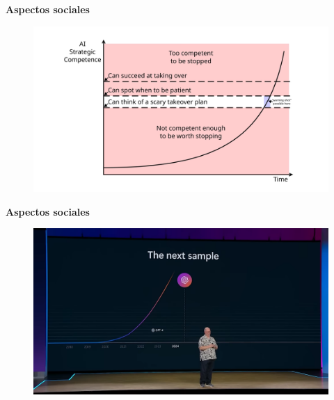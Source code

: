 \documentclass{beamer}
\begin{document}
\begin{frame}{\bfseries Aspectos sociales}
    \begin{figure}
        \centering
        \includegraphics[width=1\linewidth]{dangers-exp.png}
        \captionsetup{labelformat=empty}
    \end{figure}
\end{frame}

\begin{frame}{\bfseries Aspectos sociales}
    \begin{figure}
        \centering
        \includegraphics[width=1\linewidth]{whale.png}
        \captionsetup{labelformat=empty}
    \end{figure}
\end{frame}



% 
% 
\end{document}
